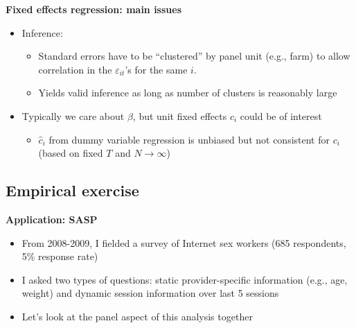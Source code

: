 \documentclass[notes=show]{beamer}
\begin{document}
\begin{frame}[plain]
	\begin{center}
	\textbf{Fixed effects regression: main issues}
	\end{center}
	
	\begin{itemize}
	\item Inference:
		\begin{itemize}
		\item Standard errors have to be ``clustered'' by panel unit (e.g., farm) to allow correlation in the $\varepsilon_{it}$'s for the same $i$.
		\item Yields valid inference as long as number of clusters is reasonably large
		\end{itemize}	
	\item Typically we care about $\beta$, but unit fixed effects $c_i$ could be of interest
		\begin{itemize}
		\item $\widehat{c}_i$ from dummy variable regression is unbiased but not consistent for $c_i$ (based on fixed $T$ and $N\rightarrow \infty$)
		\end{itemize}
	\end{itemize}
\end{frame}

\subsection{Empirical exercise}

\begin{frame}
\begin{center}
\textbf{Application: SASP}
\end{center}

\begin{itemize}
\item From 2008-2009, I fielded a survey of Internet sex workers (685 respondents, 5\% response rate)
\item I asked two types of questions: static provider-specific information (e.g., age, weight) and dynamic session information over last 5 sessions
\item Let's look at the panel aspect of this analysis together
\end{itemize}

\end{frame}
\end{document}

